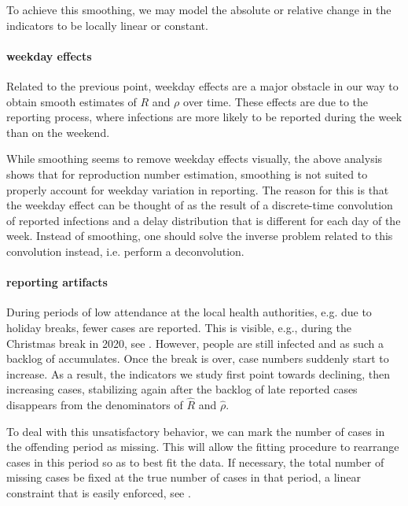 To achieve this smoothing, we may model the absolute or relative change in the indicators to be locally linear or constant. 

\paragraph{weekday effects}
Related to the previous point, weekday effects are a major obstacle in our way to obtain smooth estimates of $R$ and $\rho$ over time. These effects are due to the reporting process, where infections are more likely to be reported during the week than on the weekend. 

While smoothing seems to remove weekday effects visually, the above analysis shows that for reproduction number estimation, smoothing is not suited to properly account for weekday variation in reporting. The reason for this is that the weekday effect can be thought of as the result of a discrete-time convolution of reported infections and a delay distribution that is different for each day of the week. Instead of smoothing, one should solve the inverse problem related to this convolution instead, i.e. perform a deconvolution. 

\paragraph{reporting artifacts}
During periods of low attendance at the local health authorities, e.g. due to holiday breaks, fewer cases are reported. This is visible, e.g., during the Christmas break in 2020, see . However, people are still infected and as such a backlog of accumulates. Once the break is over, case numbers suddenly start to increase. As a result, the indicators we study first point towards declining, then increasing cases, stabilizing again after the backlog of late reported cases disappears from the denominators of $\hat R$ and $\hat \rho$. 

To deal with this unsatisfactory behavior, we can mark the number of cases in the offending period as missing. This will allow the fitting procedure to rearrange cases in this period so as to best fit the data. If necessary, the total number of missing cases be fixed at the true number of cases in that period, a linear constraint that is easily enforced, see .
\bigskip

